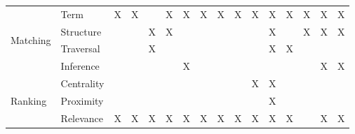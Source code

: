 \begin{table}[htbp]
\begin{tabular}{|r|r||c|c|r|c|c|c|c|c|c|c|c|c|c|r|}
    \hline
    \multicolumn{1}{|l|}{\multirow{4}[8]{*}{Matching}} & \multicolumn{1}{l||}{Term} & X     & X     &       & X     & X     & X     & X     & X     & X     & X     & X     & X     & X     & \multicolumn{1}{c|}{X} \bigstrut\\
\cline{2-16}    \multicolumn{1}{|l|}{} & \multicolumn{1}{l||}{Structure } &       &       & X     & X     &       &       &       &       &       & X     &       & X     & X     & \multicolumn{1}{c|}{X} \bigstrut\\
\cline{2-16}    \multicolumn{1}{|l|}{} & \multicolumn{1}{l||}{Traversal} &       &       & X     &       &       &       &       &       &       & X     & X     &       &       &  \bigstrut\\
\cline{2-16}    \multicolumn{1}{|l|}{} & \multicolumn{1}{l||}{Inference} &       &       &       &       & X     &       &       &       &       &       &       &       & X     & \multicolumn{1}{c|}{X} \bigstrut\\
    \hline
    \multicolumn{1}{|l|}{\multirow{3}[6]{*}{Ranking}} & \multicolumn{1}{l||}{Centrality} &       &       &       &       &       &       &       &       & X     & X     &       &       &       &  \bigstrut\\
\cline{2-16}    \multicolumn{1}{|l|}{} & \multicolumn{1}{l||}{Proximity} &       &       &       &       &       &       &       &       &       & X     &       &       &       &  \bigstrut\\
\cline{2-16}    \multicolumn{1}{|l|}{} & \multicolumn{1}{l||}{Relevance} & X     & X     & X     & X     & X     & X     & X     & X     & X     & X     & X     &       & X     & \multicolumn{1}{c|}{X} \bigstrut\\
    \hline
    \end{tabular}%
  	\label{tab:examples}%
\end{table}%
